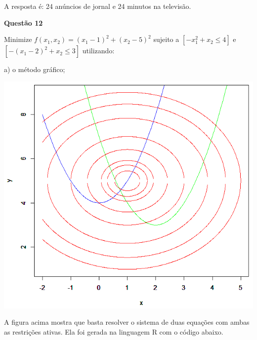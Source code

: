 \documentclass{rbfin}
\begin{document}
A resposta é: 24 anúncios de jornal e 24 minutos na televisão.

\vspace{6mm}

\large

\textbf{Questão 12}

\normalsize

\vspace{6mm}

\doublespacing

Minimize $f(x_1, x_2) = (x_1 - 1)^2 + (x_2 - 5)^2$ sujeito a $[-x_1^2 + x_2 \le 4]$ e $[-(x_1 - 2)^2 + x_2 \le 3]$ utilizando:

a) o método gráfico;

\begin{center}
\includegraphics[scale=0.5]{q12}
\end{center}

A figura acima mostra que basta resolver o sistema de duas equações com ambas as restrições ativas. Ela foi gerada na linguagem R com o código abaixo.
\end{document}
